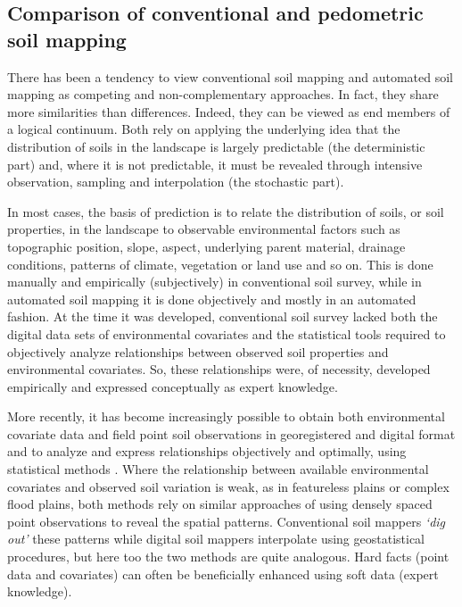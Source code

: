 \documentclass[11pt]{krantz}
\theoremstyle{definition}
\theoremstyle{definition}
\theoremstyle{definition}
\theoremstyle{remark}
\begin{document}
\hypertarget{comparison-conventional-pm}{%
\subsection{Comparison of conventional and pedometric soil
mapping}\label{comparison-conventional-pm}}

There has been a tendency to view conventional soil mapping and
automated soil mapping as competing and non-complementary approaches. In
fact, they share more similarities than differences. Indeed, they can be
viewed as end members of a logical continuum. Both rely on applying the
underlying idea that the distribution of soils in the landscape is
largely predictable (the deterministic part) and, where it is not
predictable, it must be revealed through intensive observation, sampling
and interpolation (the stochastic part).

In most cases, the basis of prediction is to relate the distribution of
soils, or soil properties, in the landscape to observable environmental
factors such as topographic position, slope, aspect, underlying parent
material, drainage conditions, patterns of climate, vegetation or land
use and so on. This is done manually and empirically (subjectively) in
conventional soil survey, while in automated soil mapping it is done
objectively and mostly in an automated fashion. At the time it was
developed, conventional soil survey lacked both the digital data sets of
environmental covariates and the statistical tools required to
objectively analyze relationships between observed soil properties and
environmental covariates. So, these relationships were, of necessity,
developed empirically and expressed conceptually as expert knowledge.

More recently, it has become increasingly possible to obtain both
environmental covariate data and field point soil observations in
georegistered and digital format and to analyze and express
relationships objectively and optimally, using statistical methods
\citep{Pebesma2006TiG, McBratney2011HSS}. Where the relationship between
available environmental covariates and observed soil variation is weak,
as in featureless plains or complex flood plains, both methods rely on
similar approaches of using densely spaced point observations to reveal
the spatial patterns. Conventional soil mappers \emph{`dig out'} these
patterns while digital soil mappers interpolate using geostatistical
procedures, but here too the two methods are quite analogous. Hard facts
(point data and covariates) can often be beneficially enhanced using
soft data (expert knowledge).
\end{document}
